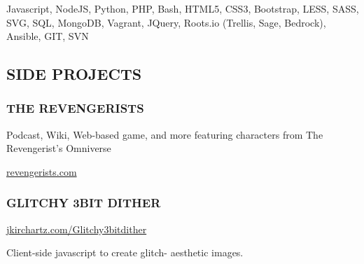 \documentclass[]{article}
\begin{document}
\begin{multicols}{2}
\color{grey} Javascript, NodeJS, Python, PHP, Bash, HTML5, CSS3,
Bootstrap, LESS, SASS, SVG, SQL, MongoDB, Vagrant, JQuery, Roots.io
(Trellis, Sage, Bedrock), Ansible, GIT, SVN

\subsection{\texorpdfstring{\color{blue} SIDE
PROJECTS}{ SIDE PROJECTS}}\label{side-projects}

\subsubsection{THE REVENGERISTS}\label{the-revengerists}

Podcast, Wiki, Web-based game, and more featuring characters from The
Revengerist's Omniverse

\href{http://revengerists.com}{revengerists.com}

\subsubsection{GLITCHY 3BIT DITHER}\label{glitchy-3bit-dither}

\href{http://jkirchartz.com/Glitchy3bitdither}{jkirchartz.com/Glitchy3bitdither}

Client-side javascript to create glitch- aesthetic images.

\end{multicols}
\end{document}
